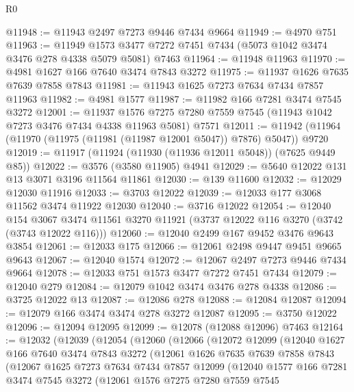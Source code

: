 \begin{lexlean}{R0}
\begin{coremodule}
@11948 := @11943 @2497 @7273 @9446 @7434 @9664
@11949 := @4970 @751
@11963 := @11949
    @1573
    @3477
    @7272
    @7451
    @7434
    (@5073 @1042 @3474 @3476 @278 @4338 @5079 @5081)
    @7463
@11964 := @11948 @11963
@11970 := @4981 @1627 @166 @7640 @3474 @7843 @3272
@11975 := @11937 @1626 @7635 @7639 @7858 @7843
@11981 := @11943 @1625 @7273 @7634 @7434 @7857 @11963
@11982 := @4981 @1577
@11987 := @11982 @166 @7281 @3474 @7545 @3272
@12001 := @11937
    @1576
    @7275
    @7280
    @7559
    @7545
    (@11943 @1042 @7273 @3476 @7434 @4338 @11963 @5081)
    @7571
@12011 := @11942 (@11964 (@11970 (@11975 (@11981 (@11987 @12001 @5047)) @7876) @5047)) @9720
@12019 := @11917 (@11924 (@11930 (@11936 @12011 @5048)) (@7625 @9449 @85))
@12022 := @3576 (@3580 @11905) @4941
@12029 := @5640 @12022 @131 @13 @3071 @3196 @11564 @11861
@12030 := @139 @11600
@12032 := @12029 @12030 @11916
@12033 := @3703 @12022
@12039 := @12033 @177 @3068 @11562 @3474 @11922 @12030
@12040 := @3716 @12022
@12054 := @12040
    @154
    @3067
    @3474
    @11561
    @3270
    @11921
    (@3737 @12022 @116 @3270 (@3742 (@3743 @12022 @116)))
@12060 := @12040 @2499 @167 @9452 @3476 @9643 @3854
@12061 := @12033 @175
@12066 := @12061 @2498 @9447 @9451 @9665 @9643
@12067 := @12040 @1574
@12072 := @12067 @2497 @7273 @9446 @7434 @9664
@12078 := @12033 @751 @1573 @3477 @7272 @7451 @7434
@12079 := @12040 @279
@12084 := @12079 @1042 @3474 @3476 @278 @4338
@12086 := @3725 @12022 @13
@12087 := @12086 @278
@12088 := @12084 @12087
@12094 := @12079 @166 @3474 @3474 @278 @3272 @12087
@12095 := @3750 @12022
@12096 := @12094 @12095
@12099 := @12078 (@12088 @12096) @7463
@12164 := @12032
    (@12039
      (@12054
        (@12060
          (@12066
            (@12072
              @12099
              (@12040
                @1627
                @166
                @7640
                @3474
                @7843
                @3272
                (@12061
                  @1626
                  @7635
                  @7639
                  @7858
                  @7843
                  (@12067
                    @1625
                    @7273
                    @7634
                    @7434
                    @7857
                    @12099
                    (@12040
                      @1577
                      @166
                      @7281
                      @3474
                      @7545
                      @3272
                      (@12061
                        @1576
                        @7275
                        @7280
                        @7559
                        @7545

\end{coremodule}
\end{lexlean}
